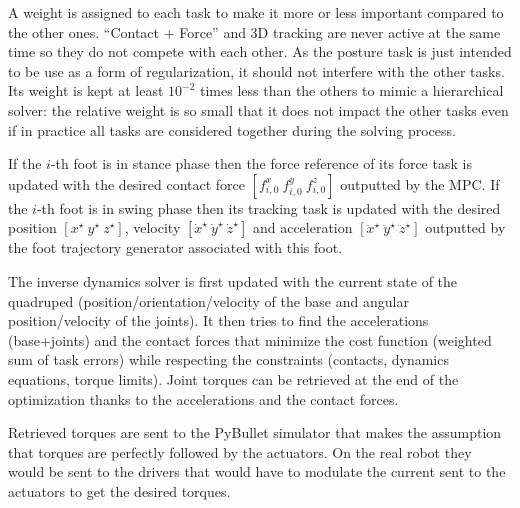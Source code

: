 \documentclass[a4paper,11pt]{article}
\begin{document}
A weight is assigned to each task to make it more or less important compared to the other ones. ``Contact + Force'' and 3D tracking are never active at the same time so they do not compete with each other. As the posture task is just intended to be use as a form of regularization, it should not interfere with the other tasks. Its weight is kept at least $10^{-2}$ times less than the others to mimic a hierarchical solver: the relative weight is so small that it does not impact the other tasks even if in practice all tasks are considered together during the solving process.

If the $i$-th foot is in stance phase then the force reference of its force task is updated with the desired contact force $[f^x_{i,0} ~ f^y_{i,0} ~ f^z_{i,0}]$ outputted by the MPC. If the $i$-th foot is in swing phase then its tracking task is updated with the desired position $[x^\star ~ y^\star ~ z^\star]$, velocity $[\dot x^\star ~ \dot y^\star ~ \dot z^\star]$ and acceleration $[\ddot x^\star ~\ddot y^\star ~ \ddot z^\star]$ outputted by the foot trajectory generator associated with this foot.

The inverse dynamics solver is first updated with the current state of the quadruped (position/orientation/velocity of the base and angular position/velocity of the joints). It then tries to find the accelerations (base+joints) and the contact forces that minimize the cost function (weighted sum of task errors) while respecting the constraints (contacts, dynamics equations, torque limits). Joint torques can be retrieved at the end of the optimization thanks to the accelerations and the contact forces. 

Retrieved torques are sent to the PyBullet simulator that makes the assumption that torques are perfectly followed by the actuators. On the real robot they would be sent to the drivers that would have to modulate the current sent to the actuators to get the desired torques.
\end{document}
